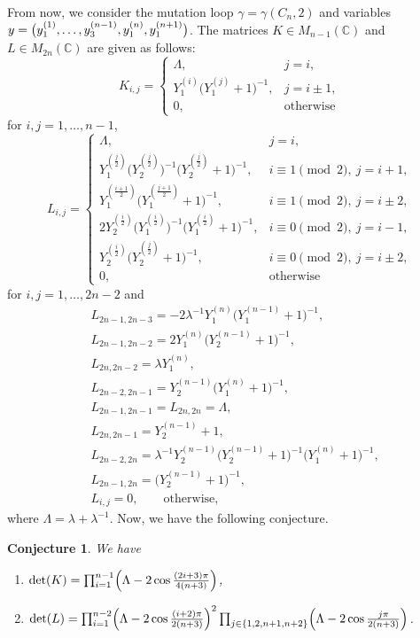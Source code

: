\documentclass[pdftex]{sigma}
\numberwithin{equation}{section}
\newtheorem{Conjecture}[Theorem]{Conjecture}
 { \theoremstyle{definition}
\newtheorem{Definition}[Theorem]{Definition}
\newtheorem{Note}[Theorem]{Note}
\newtheorem{Example}[Theorem]{Example}
\newtheorem{Remark}[Theorem]{Remark} }
\newcommand{\C}{{\mathbb C}}
\newcommand{\La}{\Lambda}
\begin{document}
From now, we consider the mutation loop $\gamma=\gamma(C_n,2)$ and variables $y=\bigl(\smash{y_1^{(1)},\dots,y_3^{(n-1)}},\allowbreak \smash{y_1^{(n)},y_1^{(n+1)}}\bigr)$.
The matrices $K\in M_{n-1}(\C)$ and $L\in M_{2n}(\C)$ are given as follows:
	\[K_{i,j}=\begin{cases}
	\La,& j=i,\\
	Y_1^{(i)}\bigl(Y_1^{(j)}+1\bigr)^{-1},& j=i\pm1 ,\\
	0,& \text{otherwise}
	\end{cases}\]
for $i,j=1,\dots,n-1$,
	\[L_{i,j}=\begin{cases}
		\La,& j=i,\\
		Y_1^{(\frac{j}{2})}\bigl(Y_2^{(\frac{j}{2})}\bigr)^{-1}\bigl(Y_2^{(\frac{j}{2})}+1\bigr)^{-1},& i\equiv1\pmod{2},\ j=i+1,\\
		Y_1^{(\frac{i+1}{2})}\bigl(Y_1^{(\frac{j+1}{2})}+1\bigr)^{-1},& i\equiv1\pmod{2},\ j=i\pm2,\\
		2Y_2^{(\frac{i}{2})}\bigl(Y_1^{(\frac{i}{2})}\bigr)^{-1}\bigl(Y_1^{(\frac{i}{2})}+1\bigr)^{-1},& i\equiv0\pmod{2},\ j=i-1,\\
		Y_2^{(\frac{i}{2})}\bigl(Y_2^{(\frac{j}{2})}+1\bigr)^{-1},& i\equiv0\pmod{2},\ j=i\pm2,\\
		0,& \text{otherwise}
	\end{cases}\]
for $i,j=1,\dots,2n-2$ and
	\begin{align*}
	&L_{2n-1,2n-3}=-2\lambda^{-1}Y_1^{(n)}\bigl(Y_1^{(n-1)}+1\bigr)^{-1},\\
	&L_{2n-1,2n-2}=2Y_1^{(n)}\bigl(Y_2^{(n-1)}+1\bigr)^{-1},\\
	&L_{2n,2n-2}=\lambda Y_1^{(n)},\\
	&L_{2n-2,2n-1}=Y_2^{(n-1)}\bigl(Y_1^{(n)}+1\bigr)^{-1},\\
	&L_{2n-1,2n-1}=L_{2n,2n}=\Lambda,\\
	&L_{2n,2n-1}=Y_2^{(n-1)}+1,\\
	&L_{2n-2,2n}=\lambda^{-1}Y_2^{(n-1)}\bigl(Y_2^{(n-1)}+1\bigr)^{-1}\bigl(Y_1^{(n)}+1\bigr)^{-1},\\
	&L_{2n-1,2n}=\bigl(Y_2^{(n-1)}+1\bigr)^{-1},\\
	&L_{i,j}=0,\qquad \text{otherwise} ,
	\end{align*}
where $\Lambda=\lambda+\lambda^{-1}$.
Now, we have the following conjecture.
	\begin{Conjecture}\label{Csol}
	We have
		\begin{enumerate}\itemsep=0pt
		\item[$1)$] $\det (K)=\prod_{i=1}^{n-1}\Bigl(\Lambda-2\cos{\frac{(2i+3)\pi}{4(n+3)}}\Bigr)$,
		\item[$2)$] $\det (L)=\prod_{i=1}^{n-2}\Bigl(\La-2\cos{\frac{(i+2)\pi}{2(n+3)}}\Bigr)^2\prod_{j\in\{1,2,n+1,n+2\}}\Bigl(\La-2\cos{\frac{j\pi}{2(n+3)}}\Bigr)$.
		\end{enumerate}
	\end{Conjecture}
\end{document}
